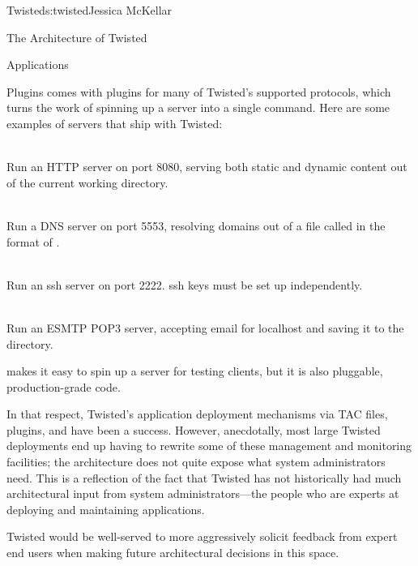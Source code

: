 \begin{aosachapter}{Twisted}{s:twisted}{Jessica McKellar}
\begin{aosasect1}{The Architecture of Twisted}
\begin{aosasect2}{Applications}
\begin{aosasect3}{Plugins}
 comes with plugins for many of Twisted's supported protocols,
which turns the work of spinning up a server into a single command. Here are
some examples of  servers that ship with Twisted:

\begin{aosadescription}
\item{} \\ Run an HTTP server on
  port 8080, serving both static and dynamic content out of the
  current working directory.

\item{} \\ Run a DNS server
  on port 5553, resolving domains out of a file called  in the
  format of .

\item{}  \\ Run an ssh server on port
  2222. ssh keys must be set up independently.

\item{} \\ Run an
  ESMTP POP3 server, accepting email for localhost and saving it to
  the  directory.
\end{aosadescription}

 makes it easy to spin up a server for testing clients,
but it is also pluggable, production-grade code.

In that respect, Twisted's application deployment mechanisms via TAC files,
plugins, and  have been a success. However, anecdotally, most
large Twisted deployments end up having to rewrite some of these management and
monitoring facilities; the architecture does not quite expose what system
administrators need. This is a reflection of the fact that Twisted has not
historically had much architectural input from system administrators---the
people who are experts at deploying and maintaining applications.

Twisted would be well-served to more aggressively solicit feedback from
expert end users when making future architectural decisions in this space.

\end{aosasect3}

\end{aosasect2}


\end{aosasect1}
\end{aosachapter}
